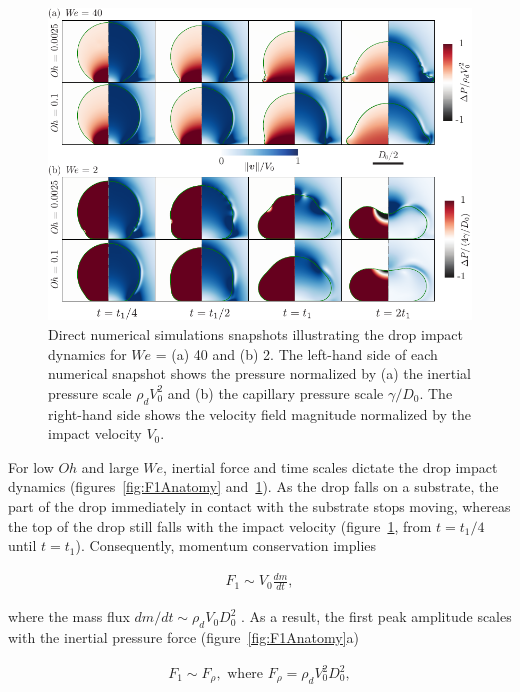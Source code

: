 \documentclass{jfm}
\begin{document}
\begin{figure}
	\centering
	\includegraphics[width=\textwidth]{Figures/F1_Drops_LowOh_v2.pdf}
	\caption{Direct numerical simulations snapshots illustrating the drop impact dynamics for $We$ = (a) 40 and (b) 2. The left-hand side of each numerical snapshot shows the pressure normalized by (a) the inertial pressure scale $\rho_dV_0^2$ and (b) the capillary pressure scale $\gamma/D_0$. The right-hand side shows the velocity field magnitude normalized by the impact velocity $V_0$.}
	\label{fig:F1AnatomyLowOh}
\end{figure}

For low $Oh$ and large $We$, inertial force and time scales dictate the drop impact dynamics (figures~\ref{fig:F1Anatomy} and~\ref{fig:F1AnatomyLowOh}). As the drop falls on a substrate, the part of the drop immediately in contact with the substrate stops moving, whereas the top of the drop still falls with the impact velocity (figure~\ref{fig:F1AnatomyLowOh}, from $t = t_1/4$ until $t = t_1$). Consequently, momentum conservation implies 

\begin{align}
	F_1 \sim V_0\frac{dm}{dt},
\end{align}

\noindent where the mass flux $dm/dt \sim \rho_d V_0D_0^2$ \citep{Soto2014, zhang2022impact}. As a result, the first peak amplitude scales with the inertial pressure force (figure~\ref{fig:F1Anatomy}a)

\begin{align}\label{eq:F1}
	F_1 \sim F_\rho,\text{ where }F_\rho =  \rho_d V_0^2D_0^2,
\end{align}
\end{document}
